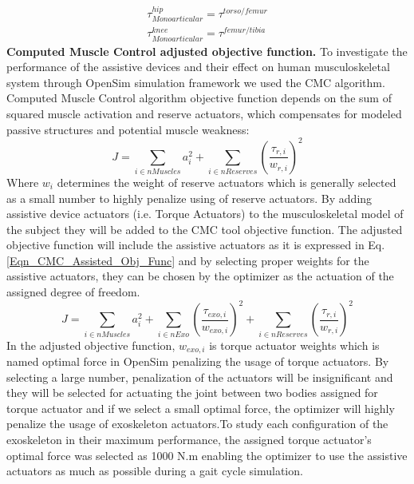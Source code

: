 \documentclass[10pt,letterpaper]{article}
\begin{document}
\begin{align}\label{Eqn_Monoarticular_Torque_Act}
\tau^{hip}_{Monoarticular} = \tau^{torso/femur}\\
\tau^{knee}_{Monoarticular} = \tau^{femur/tibia}
\end{align}
\newline
\newline
\textbf{Computed Muscle Control adjusted objective function.} To investigate the performance of the assistive devices and their effect on human musculoskeletal system through OpenSim simulation framework we used the CMC algorithm. Computed Muscle Control algorithm objective function depends on the sum of squared muscle activation and reserve actuators, which compensates for modeled passive structures and potential muscle weakness\cite{93}:
\begin{equation}\label{Eqn_CMC_Normal_Obj_Func}
J = \sum_{i\in nMuscles} a_{i}^{2} + \sum_{i \in nReserves} (\frac{\tau_{r,i}}{w_{r,i}})^2
\end{equation}
Where $w_i$ determines the weight of reserve actuators which is generally selected as a small number to highly penalize using of reserve actuators. By adding assistive device actuators (i.e. Torque Actuators) to the musculoskeletal model of the subject they will be added to the CMC tool objective function. The adjusted objective function will include the assistive actuators as it is expressed in Eq. \eqref{Eqn_CMC_Assisted_Obj_Func} and by selecting proper weights for the assistive actuators, they can be chosen by the optimizer as the actuation of the assigned degree of freedom.
\begin{equation}\label{Eqn_CMC_Assisted_Obj_Func}
	J = \sum_{i\in nMuscles} a_{i}^{2} + \sum_{i \in nExo} \left(\frac{\tau_{exo,i}}{w_{exo,i}}\right)^{2} +  \sum_{i \in nReserves} \left(\frac{\tau_{r,i}}{w_{r,i}}\right)^2
\end{equation}
In the adjusted objective function, $w_{exo,i}$ is torque actuator weights which is named optimal force in OpenSim \cite{93} penalizing the usage of torque actuators. By selecting a large number, penalization of the actuators will be insignificant and they will be selected for actuating the joint between two bodies assigned for torque actuator and if we select a small optimal force, the optimizer will highly penalize the usage of exoskeleton actuators.To study each configuration of the exoskeleton in their maximum performance, the assigned torque actuator's optimal force was selected as 1000 N.m enabling the optimizer to use the assistive actuators as much as possible during a gait cycle simulation.\\
\end{document}
